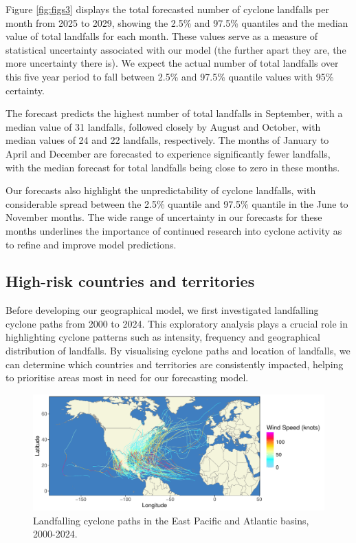 \documentclass[
]{article}
\begin{document}
Figure \ref{fig:figs3} displays the total forecasted number of cyclone landfalls per month from 2025 to 2029, showing the 2.5\% and 97.5\% quantiles and the median value of total landfalls for each month. These values serve as a measure of statistical uncertainty associated with our model (the further apart they are, the more uncertainty there is). We expect the actual number of total landfalls over this five year period to fall between 2.5\% and 97.5\% quantile values with 95\% certainty.

The forecast predicts the highest number of total landfalls in September, with a median value of 31 landfalls, followed closely by August and October, with median values of 24 and 22 landfalls, respectively. The months of January to April and December are forecasted to experience significantly fewer landfalls, with the median forecast for total landfalls being close to zero in these months.

Our forecasts also highlight the unpredictability of cyclone landfalls, with considerable spread between the 2.5\% quantile and 97.5\% quantile in the June to November months. The wide range of uncertainty in our forecasts for these months underlines the importance of continued research into cyclone activity as to refine and improve model predictions.

\subsection{High-risk countries and territories}\label{high-risk-countries-and-territories}

Before developing our geographical model, we first investigated landfalling cyclone paths from 2000 to 2024. This exploratory analysis plays a crucial role in highlighting cyclone patterns such as intensity, frequency and geographical distribution of landfalls. By visualising cyclone paths and location of landfalls, we can determine which countries and territories are consistently impacted, helping to prioritise areas most in need for our forecasting model.

\begin{figure}

{\centering \includegraphics{../outputs/eda-hurricane-data/landfall-map} 

}

\caption{Landfalling cyclone paths in the East Pacific and Atlantic basins, 2000-2024.}\label{fig:figs4}
\end{figure}
\end{document}
